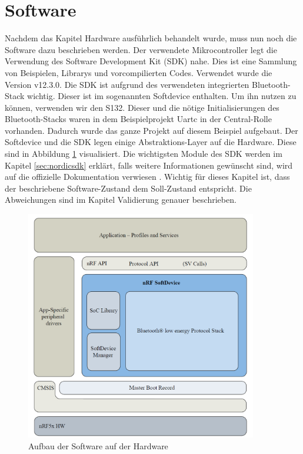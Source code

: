 \section{Software}\label{sec:software}
Nachdem das Kapitel Hardware ausführlich behandelt wurde, muss nun noch die Software dazu beschrieben werden. Der verwendete Mikrocontroller legt die Verwendung des Software Development Kit \cite{nordic_sdk} (SDK) nahe. Dies ist eine Sammlung von Beispielen, Librarys und vorcompilierten Codes. Verwendet wurde die Version v12.3.0. Die SDK ist aufgrund des verwendeten integrierten Bluetooth-Stack wichtig. Dieser ist im sogenannten Softdevice enthalten. Um ihn nutzen zu können, verwenden wir den S132. Dieser und die nötige Initialisierungen des Bluetooth-Stacks waren in dem Beispielprojekt Uartc in der Central-Rolle vorhanden. Dadurch wurde das ganze Projekt auf diesem Beispiel aufgebaut. Der Softdevice und die SDK legen einige Abstraktions-Layer auf die Hardware. Diese sind in Abbildung \ref{fig:Software_Layers} visualisiert. Die wichtigsten Module des SDK werden im Kapitel \ref{sec:nordicsdk} erklärt, falls weitere Informationen gewünscht sind, wird auf die offizielle Dokumentation verwiesen \cite{nordic_info}. Wichtig für dieses Kapitel ist, dass der beschriebene Software-Zustand dem Soll-Zustand entspricht. Die Abweichungen sind im Kapitel Validierung genauer beschrieben.


\begin{figure}[htbp!!!!]
	\centering
	\includegraphics[width=0.9\textwidth]{Data/Software_Layers.PNG}
	\caption[Software:Layers]{Aufbau der Software auf der Hardware}
	\label{fig:Software_Layers}
\end{figure} 

